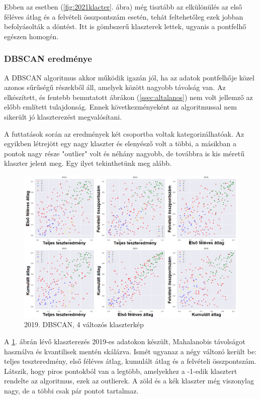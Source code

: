 \documentclass[12pt]{article}
\begin{document}
Ebben az esetben (\ref{fig:2021klacter}. ábra) még tisztább az elkülönülés az első féléves átlag és a felvételi összpontszám esetén, tehát feltehetőleg ezek jobban befolyásolták a döntést. Itt is gömbszerű klaszterek lettek, ugyanis a pontfelhő egészen homogén.

\subsubsection{DBSCAN eredménye}

A DBSCAN algoritmus akkor működik igazán jól, ha az adatok pontfelhője közel azonos sűrűségű részekből áll, amelyek között nagyobb távolság van. Az elkészített, és fentebb bemutatott ábrákon (\ref{ssec:altalanos}) nem volt jellemző az előbb említett tulajdonság. Ennek következményeként az algoritmussal nem sikerült jó klaszterezést megvalósítani.

A futtatások során az eredmények két csoportba voltak kategorizálhatóak. Az egyikben létrejött egy nagy klaszter és elenyésző volt a többi, a másikban a pontok nagy része "outlier" volt és néhány nagyobb, de továbbra is kis méretű klaszter jelent meg. Egy ilyet tekinthetünk meg alább.

\begin{figure}[H]
\centering
\includegraphics[width = \textwidth]{kepek/dbscan2.png}
\caption{2019. DBSCAN, 4 változós klaszterkép}
\label{fig:dbscan2}
\end{figure}

A \ref{fig:dbscan2}. ábrán lévő klaszterezés 2019-es adatokon készült, Mahalanobis távolságot használva és kvantilisek mentén skálázva. Ismét ugyanaz a négy változó került be: teljes teszteredmény, első féléves átlag, kumulált átlag és a felvételi összpontszám. Látszik, hogy piros pontokból van a legtöbb, amelyekhez a -1-edik klasztert rendelte az algoritmus, ezek az outlierek. A zöld és a kék klaszter még viszonylag nagy, de a többi csak pár pontot tartalmaz.
\end{document}

